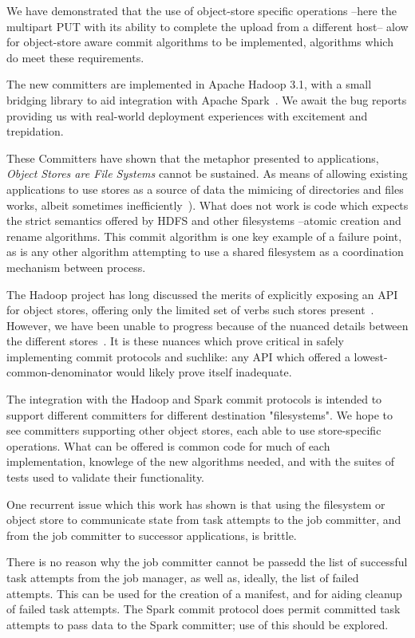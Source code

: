 \documentclass[conference]{IEEEtran}
\begin{document}
We have demonstrated that the use of object-store specific operations --here
the multipart PUT with its ability to complete the upload from a different host--
alow for object-store aware commit algorithms to be implemented,
algorithms which do meet these requirements.

The new committers are implemented in Apache Hadoop 3.1, with a small bridging
library to aid integration with Apache Spark\ \cite{HADOOP-13786}.
We await the bug reports providing us with real-world deployment experiences
with excitement and trepidation.


These Committers have shown that the metaphor presented to applications,
\emph{Object Stores are File Systems} cannot be sustained.
As means of allowing existing applications to use stores as a source
of data the mimicing of directories and files works, albeit sometimes
inefficiently\ \cite{HADOOP-13208}).
What does not work is code which expects the strict semantics
offered by HDFS and other filesystems --atomic creation and rename algorithms.
This commit algorithm is one key example of a failure point, as
is any other algorithm attempting to use a shared filesystem
as a coordination mechanism between process.

The Hadoop project has long discussed the merits of explicitly
exposing an API for object stores, offering only the limited
set of verbs such stores present\ \cite{HADOOP-9565}.
However, we have been unable to progress because of the nuanced details
between the different stores\ \cite{S3, WASB, ADL, GCS}.
It is these nuances which prove critical in safely implementing
commit protocols and suchlike: any API which offered a lowest-common-denominator
would likely prove itself inadequate.

The integration with the Hadoop and Spark commit protocols is intended
to support different committers for different destination "filesystems".
We hope to see committers supporting other object stores, each
able to use store-specific operations.
What can be offered is common code for much of each implementation,
knowlege of the new algorithms needed, and
with the suites of tests used to validate their functionality.

One recurrent issue which this work has shown is that using the
filesystem or object store to communicate state from task attempts
to the job committer, and from the job committer to successor
applications, is brittle.

There is no reason why the job committer cannot be passedd the list of
successful task attempts from the job manager, as well as, ideally,
the list of failed attempts.
This can be used for the creation of a manifest, and for aiding cleanup
of failed task attempts.
The Spark commit protocol does permit committed task attempts to pass data
to the Spark committer;
use of this should be explored.
\end{document}
